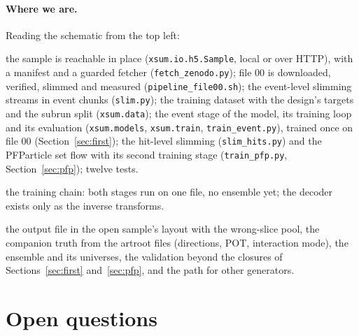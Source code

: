 \documentclass[10pt,letterpaper]{article}
\newcommand{\code}[1]{\texttt{#1}}
\newcommand{\sdone}{\textcolor{cdone}{\textbf{done}}}
\newcommand{\spart}{\textcolor{cpart}{\textbf{partly}}}
\newcommand{\smiss}{\textcolor{cmiss}{\textbf{not started}}}
\begin{document}
\paragraph{Where we are.} Reading the schematic from the top left:
\begin{description}[nosep, leftmargin=28mm, style=sameline]
\item[\sdone] the sample is reachable in place (\code{xsum.io.h5.Sample}, local or over HTTP), with a manifest and a
  guarded fetcher (\code{fetch\_zenodo.py}); file 00 is downloaded, verified, slimmed and measured
  (\code{pipeline\_file00.sh}); the event-level slimming streams in event chunks (\code{slim.py}); the training
  dataset with the design's targets and the subrun split (\code{xsum.data}); the event stage of the model, its
  training loop and its evaluation (\code{xsum.models}, \code{xsum.train}, \code{train\_event.py}), trained once on
  file 00 (Section~\ref{sec:first}); the hit-level slimming (\code{slim\_hits.py}) and the PFParticle set flow with
  its second training stage (\code{train\_pfp.py}, Section~\ref{sec:pfp}); twelve tests.
\item[\spart] the training chain: both stages run on one file, no ensemble yet; the decoder exists only as the inverse
  transforms.
\item[\smiss] the output file in the open sample's layout with the wrong-slice pool, the companion truth from the
  artroot files (directions, POT, interaction mode), the ensemble and its universes, the validation beyond the closures
  of Sections~\ref{sec:first} and~\ref{sec:pfp}, and the path for other generators.
\end{description}

\section{Open questions}\label{sec:open}
\end{document}
